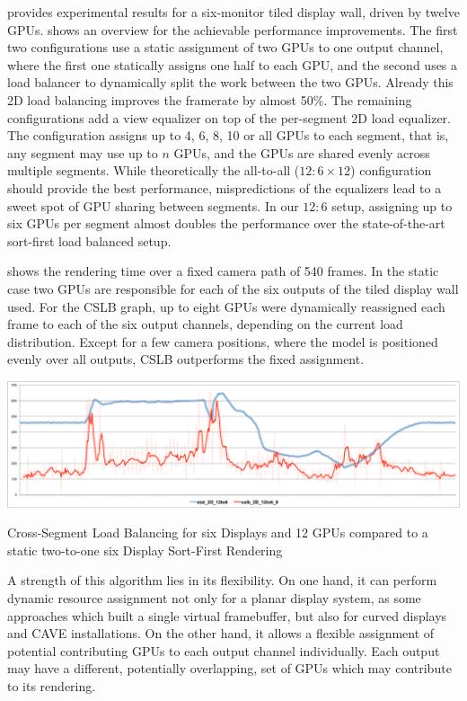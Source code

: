 \cite{EEP:11} provides experimental results for a six-monitor tiled display wall,
driven by twelve GPUs.  shows an overview for the achievable
performance improvements. The first two configurations use a static assignment
of two GPUs to one output channel, where the first one statically assigns one
half to each GPU, and the second uses a load balancer to dynamically split the
work between the two GPUs. Already this 2D load balancing improves the
framerate by almost 50\%. The remaining configurations add a view equalizer on
top of the per-segment 2D load equalizer. The configuration assigns up to 4, 6,
8, 10 or all GPUs to each segment, that is, any segment may use up to $n$ GPUs,
and the GPUs are shared evenly across multiple segments. While theoretically
the all-to-all ($12:6\times 12$) configuration should provide the best
performance, mispredictions of the equalizers lead to a sweet spot of GPU
sharing between segments. In our $12:6$ setup, assigning up to six GPUs per
segment almost doubles the performance over the state-of-the-art sort-first
load balanced setup.

 shows the rendering time over a fixed camera path of 540 frames.
In the static case two GPUs are responsible for each of the six outputs of the
tiled display wall used. For the CSLB graph, up to eight GPUs were dynamically
reassigned each frame to each of the six output channels, depending on the
current load distribution. Except for a few camera positions, where the model is
positioned evenly over all outputs, CSLB outperforms the fixed assignment.

\begin{benchmark}[h!t]
  \centering
  \includegraphics[width=\textwidth]{results/cslb}
  \caption{Cross-Segment Load Balancing for six Displays and 12 GPUs compared to a static two-to-one six Display Sort-First Rendering}
  \label{rCSLB}
\end{benchmark}

A strength of this algorithm lies in its flexibility. On one hand, it can
perform dynamic resource assignment not only for a planar display system, as
some approaches which built a single virtual framebuffer, but also for curved
displays and CAVE installations. On the other hand, it allows a flexible
assignment of potential contributing GPUs to each output channel individually.
Each output may have a different, potentially overlapping, set of GPUs which
may contribute to its rendering.

